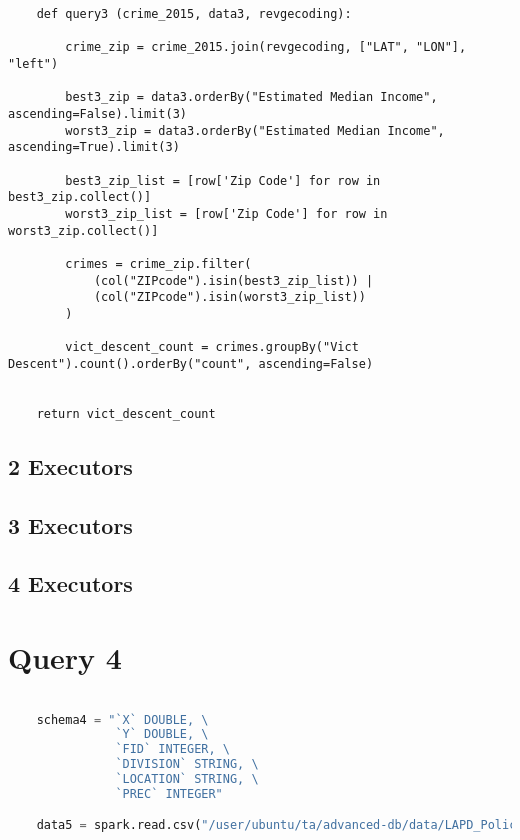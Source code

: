 \documentclass{article}
\begin{document}
\begin{lstlisting}
    def query3 (crime_2015, data3, revgecoding):

        crime_zip = crime_2015.join(revgecoding, ["LAT", "LON"], "left")

        best3_zip = data3.orderBy("Estimated Median Income", ascending=False).limit(3)
        worst3_zip = data3.orderBy("Estimated Median Income", ascending=True).limit(3)
        
        best3_zip_list = [row['Zip Code'] for row in best3_zip.collect()] 
        worst3_zip_list = [row['Zip Code'] for row in worst3_zip.collect()]

        crimes = crime_zip.filter(
            (col("ZIPcode").isin(best3_zip_list)) | 
            (col("ZIPcode").isin(worst3_zip_list))
        )
        
        vict_descent_count = crimes.groupBy("Vict Descent").count().orderBy("count", ascending=False)


    return vict_descent_count
\end{lstlisting}

\subsection*{2 Executors}
\subsection*{3 Executors}

\subsection*{4 Executors}

\section*{Query 4}

\begin{lstlisting}[language = Python]

    schema4 = "`X` DOUBLE, \
               `Y` DOUBLE, \
               `FID` INTEGER, \
               `DIVISION` STRING, \
               `LOCATION` STRING, \
               `PREC` INTEGER"

    data5 = spark.read.csv("/user/ubuntu/ta/advanced-db/data/LAPD_Police_Stations.csv", header=True, schema=schema4)


\end{lstlisting}
    
\end{document}
